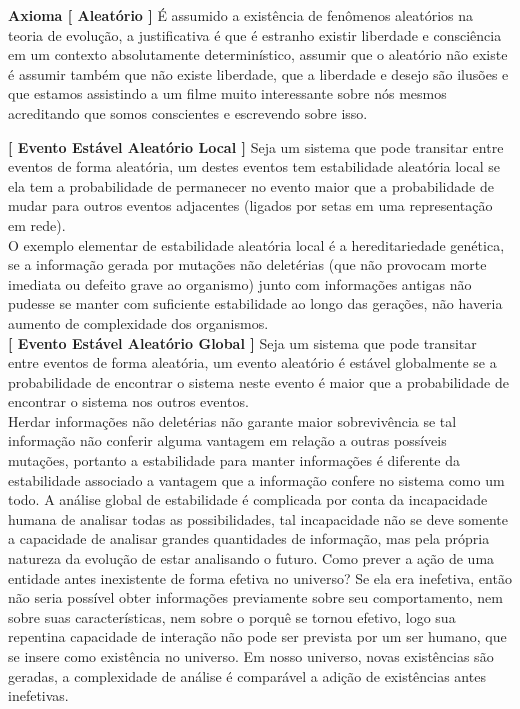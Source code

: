 \documentclass[10pt,a4paper]{report}
\begin{document}
\hspace{\baselineskip}

\textbf{Axioma [ Aleatório ]} É assumido a existência de fenômenos aleatórios na teoria de evolução, a justificativa é que é estranho existir liberdade e consciência em um contexto absolutamente determinístico, assumir que o aleatório não existe é assumir também que não existe liberdade, que a liberdade e desejo são ilusões e que estamos assistindo a um filme muito interessante sobre nós mesmos acreditando que somos conscientes e escrevendo sobre isso.

\hspace{\baselineskip}

\textbf{[ Evento Estável Aleatório Local ]} Seja um sistema que pode transitar entre eventos de forma aleatória, um destes eventos tem estabilidade aleatória local se ela tem a probabilidade de permanecer no evento maior que a probabilidade de mudar para outros eventos adjacentes (ligados por setas em uma representação em rede).\\

O exemplo elementar de estabilidade aleatória local é a hereditariedade genética, se a informação gerada por mutações não deletérias (que não provocam morte imediata ou defeito grave ao organismo) junto com informações antigas não pudesse se manter com suficiente estabilidade ao longo das gerações, não haveria aumento de complexidade dos organismos. \\

\textbf{[ Evento Estável Aleatório Global ]} Seja um sistema que pode transitar entre eventos de forma aleatória, um evento aleatório é estável globalmente se a probabilidade de encontrar o sistema neste evento é maior que a probabilidade de encontrar o sistema nos outros eventos.\\

Herdar informações não deletérias não garante maior sobrevivência se tal informação não conferir alguma vantagem em relação a outras possíveis mutações, portanto a estabilidade para manter informações é diferente da estabilidade associado a vantagem que a informação confere no sistema como um todo. A análise global de estabilidade é complicada por conta da incapacidade humana de analisar todas as possibilidades, tal incapacidade não se deve somente a capacidade de analisar grandes quantidades de informação, mas pela própria natureza da evolução de estar analisando o futuro. Como prever a ação de uma entidade antes inexistente de forma efetiva no universo? Se ela era inefetiva, então não seria possível obter informações previamente sobre seu comportamento, nem sobre suas características, nem sobre o porquê se tornou efetivo, logo sua repentina capacidade de interação não pode ser prevista por um ser humano, que se insere como existência no universo. Em nosso universo, novas existências são geradas, a complexidade de análise é comparável a adição de existências antes inefetivas.\\
\end{document}
